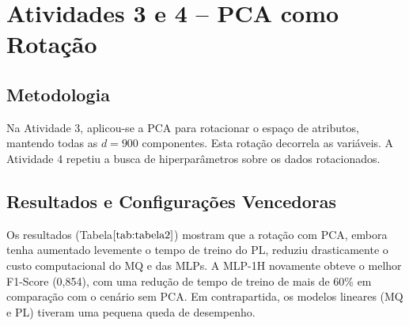 \documentclass[11pt,a4paper]{article}
\begin{document}
\section{Atividades 3 e 4 – PCA como Rotação}

\subsection{Metodologia}
Na Atividade 3, aplicou-se a PCA para rotacionar o espaço de atributos, mantendo todas as \(d=900\) componentes. Esta rotação decorrela as variáveis. A Atividade 4 repetiu a busca de hiperparâmetros sobre os dados rotacionados.

\subsection{Resultados e Configurações Vencedoras}
Os resultados (Tabela\(\ref{tab:tabela2}\)) mostram que a rotação com PCA, embora tenha aumentado levemente o tempo de treino do PL, reduziu drasticamente o custo computacional do MQ e das MLPs. A MLP-1H novamente obteve o melhor F1-Score (0,854), com uma redução de tempo de treino de mais de 60\% em comparação com o cenário sem PCA. Em contrapartida, os modelos lineares (MQ e PL) tiveram uma pequena queda de desempenho.

\begin{table}[h!]
  \centering
  \caption{Resultados médios das Atividades 3–4 (PCA como rotação, \(q=900\)).}
  \label{tab:tabela2}
\end{table}
\end{document}
